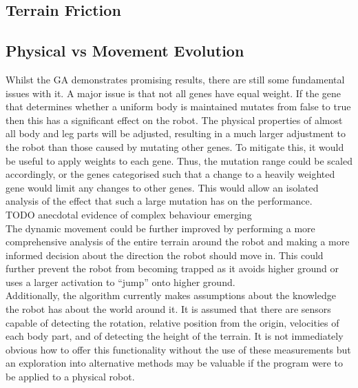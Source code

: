 \documentclass{article}
\begin{document}
\subsection{Terrain Friction}

\subsection{Physical vs Movement Evolution}


Whilst the GA demonstrates promising results, there are still some fundamental issues with it. A major issue is that not all genes have equal weight. If the gene that determines whether a uniform body is maintained mutates from false to true then this has a significant effect on the robot. The physical properties of almost all body and leg parts will be adjusted, resulting in a much larger adjustment to the robot than those caused by mutating other genes. To mitigate this, it would be useful to apply weights to each gene. Thus, the mutation range could be scaled accordingly, or the genes categorised such that a change to a heavily weighted gene would limit any changes to other genes. This would allow an isolated analysis of the effect that such a large mutation has on the performance.\\


TODO anecdotal evidence of complex behaviour emerging\\


The dynamic movement could be further improved by performing a more comprehensive analysis of the entire terrain around the robot and making a more informed decision about the direction the robot should move in. This could further prevent the robot from becoming trapped as it avoids higher ground or uses a larger activation to “jump” onto higher ground.\\ Additionally, the algorithm currently makes assumptions about the knowledge the robot has about the world around it. It is assumed that there are sensors capable of detecting the rotation, relative position from the origin, velocities of each body part, and of detecting the height of the terrain. It is not immediately obvious how to offer this functionality without the use of these measurements but an exploration into alternative methods may be valuable if the program were to be applied to a physical robot. \\
\end{document}
